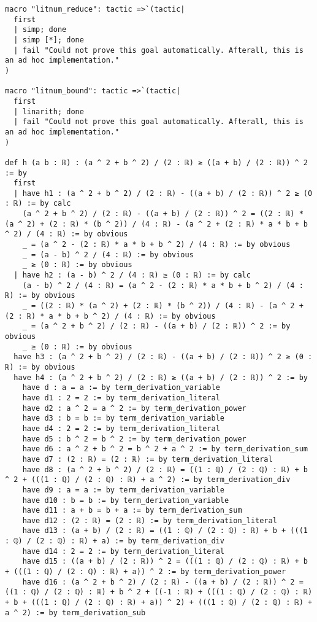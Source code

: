 \documentclass{article}
\begin{document}
\begin{tcolorbox}[colback=white!10, width=\linewidth]
\begin{lstlisting}[language=Lean4]
macro "litnum_reduce": tactic =>`(tactic|
  first
  | simp; done
  | simp [*]; done
  | fail "Could not prove this goal automatically. Afterall, this is an ad hoc implementation."
)

macro "litnum_bound": tactic =>`(tactic|
  first
  | linarith; done
  | fail "Could not prove this goal automatically. Afterall, this is an ad hoc implementation."
)

def h (a b : ℝ) : (a ^ 2 + b ^ 2) / (2 : ℝ) ≥ ((a + b) / (2 : ℝ)) ^ 2 := by
  first
  | have h1 : (a ^ 2 + b ^ 2) / (2 : ℝ) - ((a + b) / (2 : ℝ)) ^ 2 ≥ (0 : ℝ) := by calc
    (a ^ 2 + b ^ 2) / (2 : ℝ) - ((a + b) / (2 : ℝ)) ^ 2 = ((2 : ℝ) * (a ^ 2) + (2 : ℝ) * (b ^ 2)) / (4 : ℝ) - (a ^ 2 + (2 : ℝ) * a * b + b ^ 2) / (4 : ℝ) := by obvious
    _ = (a ^ 2 - (2 : ℝ) * a * b + b ^ 2) / (4 : ℝ) := by obvious
    _ = (a - b) ^ 2 / (4 : ℝ) := by obvious
    _ ≥ (0 : ℝ) := by obvious
  | have h2 : (a - b) ^ 2 / (4 : ℝ) ≥ (0 : ℝ) := by calc
    (a - b) ^ 2 / (4 : ℝ) = (a ^ 2 - (2 : ℝ) * a * b + b ^ 2) / (4 : ℝ) := by obvious
    _ = ((2 : ℝ) * (a ^ 2) + (2 : ℝ) * (b ^ 2)) / (4 : ℝ) - (a ^ 2 + (2 : ℝ) * a * b + b ^ 2) / (4 : ℝ) := by obvious
    _ = (a ^ 2 + b ^ 2) / (2 : ℝ) - ((a + b) / (2 : ℝ)) ^ 2 := by obvious
    _ ≥ (0 : ℝ) := by obvious
  have h3 : (a ^ 2 + b ^ 2) / (2 : ℝ) - ((a + b) / (2 : ℝ)) ^ 2 ≥ (0 : ℝ) := by obvious
  have h4 : (a ^ 2 + b ^ 2) / (2 : ℝ) ≥ ((a + b) / (2 : ℝ)) ^ 2 := by
    have d : a = a := by term_derivation_variable
    have d1 : 2 = 2 := by term_derivation_literal
    have d2 : a ^ 2 = a ^ 2 := by term_derivation_power
    have d3 : b = b := by term_derivation_variable
    have d4 : 2 = 2 := by term_derivation_literal
    have d5 : b ^ 2 = b ^ 2 := by term_derivation_power
    have d6 : a ^ 2 + b ^ 2 = b ^ 2 + a ^ 2 := by term_derivation_sum
    have d7 : (2 : ℝ) = (2 : ℝ) := by term_derivation_literal
    have d8 : (a ^ 2 + b ^ 2) / (2 : ℝ) = ((1 : ℚ) / (2 : ℚ) : ℝ) + b ^ 2 + (((1 : ℚ) / (2 : ℚ) : ℝ) + a ^ 2) := by term_derivation_div
    have d9 : a = a := by term_derivation_variable
    have d10 : b = b := by term_derivation_variable
    have d11 : a + b = b + a := by term_derivation_sum
    have d12 : (2 : ℝ) = (2 : ℝ) := by term_derivation_literal
    have d13 : (a + b) / (2 : ℝ) = ((1 : ℚ) / (2 : ℚ) : ℝ) + b + (((1 : ℚ) / (2 : ℚ) : ℝ) + a) := by term_derivation_div
    have d14 : 2 = 2 := by term_derivation_literal
    have d15 : ((a + b) / (2 : ℝ)) ^ 2 = (((1 : ℚ) / (2 : ℚ) : ℝ) + b + (((1 : ℚ) / (2 : ℚ) : ℝ) + a)) ^ 2 := by term_derivation_power
    have d16 : (a ^ 2 + b ^ 2) / (2 : ℝ) - ((a + b) / (2 : ℝ)) ^ 2 = ((1 : ℚ) / (2 : ℚ) : ℝ) + b ^ 2 + ((-1 : ℝ) + (((1 : ℚ) / (2 : ℚ) : ℝ) + b + (((1 : ℚ) / (2 : ℚ) : ℝ) + a)) ^ 2) + (((1 : ℚ) / (2 : ℚ) : ℝ) + a ^ 2) := by term_derivation_sub

\end{lstlisting}
\end{tcolorbox}
\end{document}
